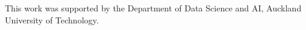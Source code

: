 \documentclass[runningheads]{llncs}
\begin{document}
\begin{credits}

\subsubsection{\ackname}
This work was supported by the Department of Data Science and AI, Auckland University of Technology.


\end{credits}




\end{document}
